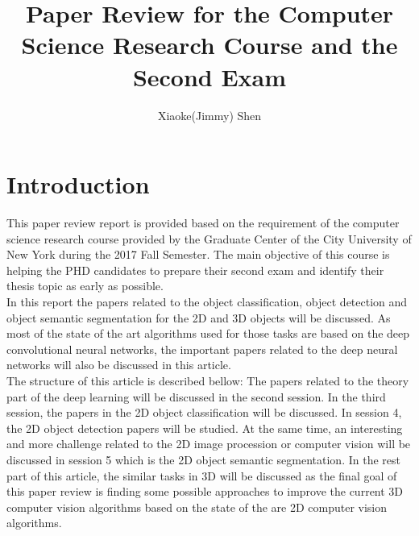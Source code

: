 \documentclass[a4paper,12pt]{article}
\begin{document}
\renewcommand\labelenumi{(\theenumi)}
\renewcommand{\vec}[1]{\mathbf{#1}}
\title {Paper Review for the Computer Science Research Course and the Second Exam }
\author{Xiaoke(Jimmy) Shen}
\maketitle
\section{Introduction}

This paper review report is provided based on the requirement of the computer science research course provided by the Graduate Center of the City University of New York during the 2017 Fall Semester. The main objective of this course is helping the PHD candidates to prepare their second exam and identify their thesis topic as early as possible\cite{ji2017}. \\
In this report the papers related to the object classification, object detection and object semantic segmentation for the 2D and 3D objects will be discussed. As most of the state of the art algorithms used for those tasks are based on the deep convolutional neural networks, the important papers related to the deep neural networks will also be discussed in this article.\\

The structure of this article is described bellow: The papers related to the theory part of the deep learning will be discussed in the second session. In the third session, the papers in the 2D object classification will be discussed. In session 4, the 2D object detection papers will be studied. At the same time, an interesting and more challenge related to the 2D image procession or computer vision will be discussed in session 5 which is the 2D object semantic segmentation. In the rest part of this article, the similar tasks in 3D will be discussed as the final goal of this paper review is finding some possible approaches to improve the current 3D computer vision algorithms based on the state of the are 2D computer vision algorithms.\\
\end{document}
